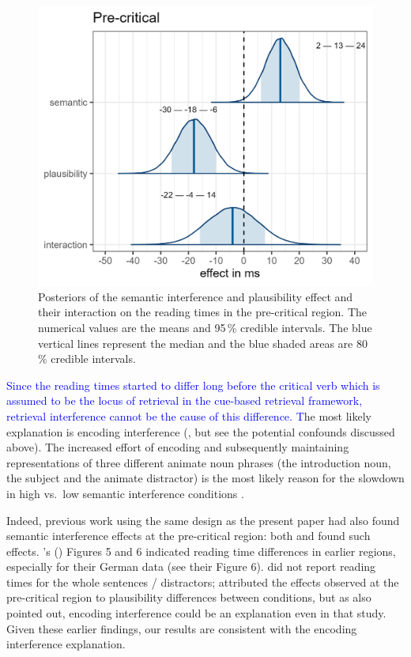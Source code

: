 \documentclass[review,preprint,12pt,authoryear,floatsintext]{elsarticle}
\begin{document}
\begin{figure}[ht]
    \centering
        \caption{Posteriors of the semantic interference and plausibility effect and their interaction on the reading times in the pre-critical region. The numerical values are the means and 95\,\% credible intervals. The blue vertical lines represent the median and the blue shaded areas are 80\,\% credible intervals.}\label{fig:posteriors_plausibility}
    \includegraphics[width=0.8\linewidth]{posteriors_spr_pooled_774_plausibility.png}
\end{figure}

\textcolor{blue}{Since the reading times started to differ long before the critical verb which is assumed to be the locus of retrieval in the cue-based retrieval framework,  retrieval interference cannot be the cause of this difference. T}he most likely explanation is encoding interference (\cite{Oberauer_Kliegl_2006}, but see the potential confounds discussed above). The increased effort of encoding and subsequently maintaining representations of three different animate noun phrases (the introduction noun, the subject and the animate distractor) is the most likely reason for the slowdown in high vs.\ low semantic interference conditions \citep[for similar findings, see e.g., ][]{lago_etal_2021, ness2019, ness2017, kush_etal_2015, gordon02}. 

Indeed, previous work using the same design as the present paper had also found semantic interference effects at the pre-critical region: both \cite{vandyke07} and \cite{mertzen} found such effects. \citeauthor{mertzen}'s (\citeyear{mertzen}) Figures 5 and 6 indicated reading time differences in earlier regions, especially for their German data (see their Figure 6). \cite{vandyke07} did not report reading times for the whole sentences / distractors;  \citeauthor{vandyke07} attributed the effects observed at the pre-critical region to plausibility differences between conditions, but as \cite{mertzen} also pointed out, encoding interference could be an explanation even in that study. Given these earlier findings, our results are consistent with the encoding interference explanation.
\end{document}
